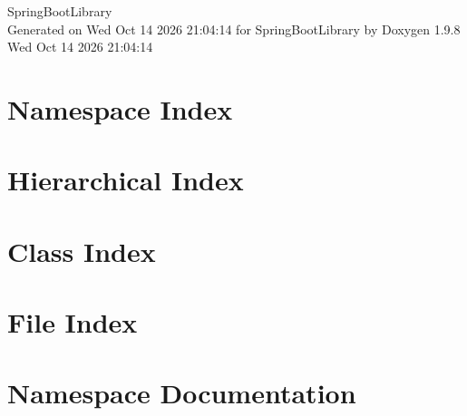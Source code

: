 \documentclass[twoside]{book}
\newcommand{\+}{\discretionary{\mbox{\scriptsize$\hookleftarrow$}}{}{}}
\newcommand{\clearemptydoublepage}{%
    \newpage{\pagestyle{empty}\cleardoublepage}%
  }
\begin{document}
  \raggedbottom
    \hypersetup{pageanchor=false,
                bookmarksnumbered=true,
                pdfencoding=unicode
               }
  \begin{titlepage}
  \vspace*{7cm}
  \begin{center}%
  {\Large Spring\+Boot\+Library}\\
  \vspace*{1cm}
  {\large Generated on Wed Oct 14 2026 21\+:04\+:14 for Spring\+Boot\+Library by Doxygen 1.9.8}\\
    \vspace*{0.5cm}
    {\small Wed Oct 14 2026 21:04:14}
  \end{center}
  \end{titlepage}
  \clearemptydoublepage
  \tableofcontents
  \clearemptydoublepage
  \hypersetup{pageanchor=true}
\chapter{Namespace Index}

\chapter{Hierarchical Index}

\chapter{Class Index}

\chapter{File Index}

\chapter{Namespace Documentation}








\end{document}
